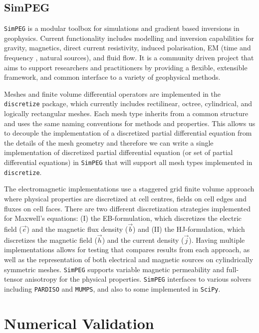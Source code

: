 \documentclass[extra, camera,%
]{gji}
\newcommand{\simpeg}{\texttt{SimPEG}\xspace}
\newcommand{\discretize}{\texttt{discretize}\xspace}
\begin{document}
\subsection{SimPEG}

\simpeg is a modular toolbox for simulations and gradient based inversions in geophysics. Current functionality includes modelling and inversion capabilities for gravity, magnetics, direct current resistivity, induced polarisation, EM (time and frequency ,  natural sources), and fluid flow. It is a community driven project that aims to support researchers and practitioners by providing a flexible, extensible framework, and common interface to a variety of geophysical methods.

Meshes and finite volume differential operators are implemented in the \discretize package, which currently includes rectilinear, octree, cylindrical, and logically rectangular meshes. Each mesh type inherits from a common structure and uses the same naming conventions for methods and properties. This allows us to decouple the implementation of a discretized partial differential equation from the details of the mesh geometry and therefore we can write a single implementation of discretized partial differential equation (or set of partial differential equations) in \simpeg that will support all mesh types implemented in \discretize.

The electromagnetic implementations use a staggered grid finite volume approach where physical properties are discretized at cell centres, fields on cell edges and fluxes on cell faces. There are two different discretization strategies implemented for Maxwell's equations: (I) the EB-formulation, which discretizes the electric field ($\vec{e}$) and the magnetic flux density ($\vec{b}$) and (II) the HJ-formulation, which discretizes the magnetic field ($\vec{h}$) and the current density ($\vec{j}$). Having multiple implementations allows for testing that compares results from each approach, as well as the representation of both electrical and magnetic sources on cylindrically symmetric meshes. \simpeg supports variable magnetic permeability and full-tensor anisotropy for the physical properties. \simpeg interfaces to various solvers including \texttt{PARDISO} and \texttt{MUMPS}, and also to some implemented in \texttt{SciPy}.

\section{Numerical Validation}
\end{document}
